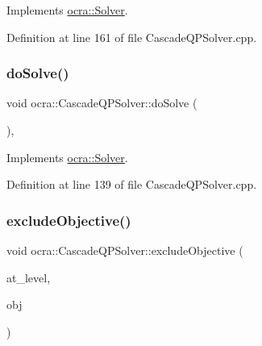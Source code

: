 Implements \hyperlink{classocra_1_1Solver_a9ab90e87025e3da7239141c48d28ab4a}{ocra\+::\+Solver}.



Definition at line 161 of file Cascade\+Q\+P\+Solver.\+cpp.

\hypertarget{classocra_1_1CascadeQPSolver_aea57e3bc9dabe277161d742af5cd88dc}{}\label{classocra_1_1CascadeQPSolver_aea57e3bc9dabe277161d742af5cd88dc} 
\subsubsection{\texorpdfstring{do\+Solve()}{doSolve()}}
{\footnotesize\ttfamily void ocra\+::\+Cascade\+Q\+P\+Solver\+::do\+Solve (\begin{DoxyParamCaption}\item[{void}]{ }\end{DoxyParamCaption})\hspace{0.3cm}{\ttfamily [protected]}, {\ttfamily [virtual]}}



Implements \hyperlink{classocra_1_1Solver_ace2d7cfe741611de6dc87a0de7e7f3a9}{ocra\+::\+Solver}.



Definition at line 139 of file Cascade\+Q\+P\+Solver.\+cpp.

\hypertarget{classocra_1_1CascadeQPSolver_a9308f8943177b4ea78e7f15a3ab55832}{}\label{classocra_1_1CascadeQPSolver_a9308f8943177b4ea78e7f15a3ab55832} 
\subsubsection{\texorpdfstring{exclude\+Objective()}{excludeObjective()}}
{\footnotesize\ttfamily void ocra\+::\+Cascade\+Q\+P\+Solver\+::exclude\+Objective (\begin{DoxyParamCaption}\item[{int}]{at\+\_\+level,  }\item[{const \hyperlink{namespaceocra_a37a91885f4fa5c523d22cb15d5673062}{ocra\+::\+Generic\+Objective} \&}]{obj }\end{DoxyParamCaption})\hspace{0.3cm}{\ttfamily [protected]}}



